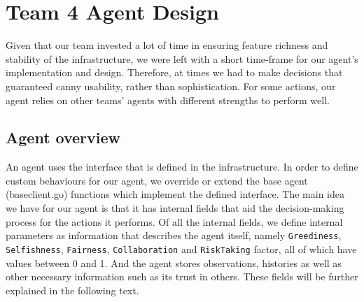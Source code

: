 



\chapter{Team 4 Agent Design}
Given that our team invested a lot of time in ensuring feature richness and stability of the infrastructure, we were left with a short time-frame for our agent's implementation and design. Therefore, at times we had to make decisions that guaranteed canny usability, rather than sophistication. For some actions, our agent relies on other teams' agents with different strengths to perform well. 

\section{Agent overview}
An agent uses the interface that is defined in the infrastructure. In order to define custom behaviours for our agent, we override or extend the base agent (baseclient.go) functions which implement the defined interface. The main idea we have for our agent is that it has internal fields that aid the decision-making process for the actions it performs. Of all the internal fields, we define internal parameters as information that describes the agent itself, namely \texttt{Greediness}, \texttt{Selfishness}, \texttt{Fairness}, \texttt{Collaboration} and \texttt{RiskTaking} factor, all of which have values between 0 and 1. And the agent stores observations, histories as well as other necessary information such as its trust in others. These fields will be further explained in the following text. %

